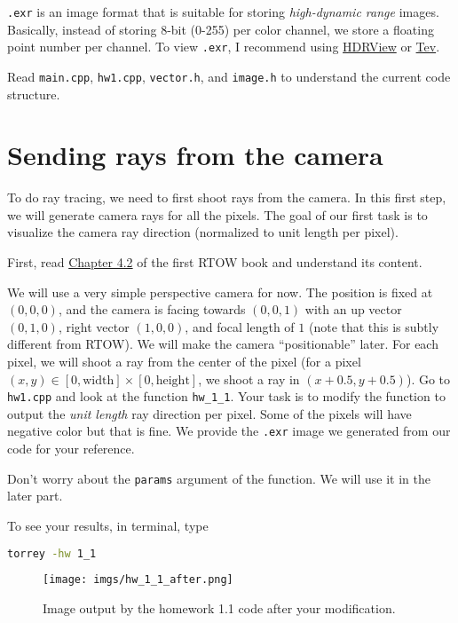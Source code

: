 \lstinline{.exr} is an image format that is suitable for storing \emph{high-dynamic range} images. Basically, instead of storing 8-bit (0-255) per color channel, we store a floating point number per channel. To view \lstinline{.exr}, I recommend using \href{https://github.com/wkjarosz/hdrview}{HDRView} or \href{https://github.com/Tom94/tev}{Tev}.

Read \lstinline{main.cpp}, \lstinline{hw1.cpp}, \lstinline{vector.h}, and \lstinline{image.h} to understand the current code structure.

\section{Sending rays from the camera}
To do ray tracing, we need to first shoot rays from the camera. In this first step, we will generate camera rays for all the pixels. The goal of our first task is to visualize the camera ray direction (normalized to unit length per pixel).

First, read \href{https://raytracing.github.io/books/RayTracingInOneWeekend.html\#rays,asimplecamera,andbackground}{Chapter 4.2} of the first RTOW book and understand its content.

We will use a very simple perspective camera for now. The position is fixed at $(0, 0, 0)$, and the camera is facing towards $(0, 0, 1)$ with an up vector $(0, 1, 0)$, right vector $(1, 0, 0)$, and focal length of $1$ (note that this is subtly different from RTOW). We will make the camera ``positionable'' later. For each pixel, we will shoot a ray from the center of the pixel (for a pixel $(x, y) \in [0, \text{width}] \times [0, \text{height}]$, we shoot a ray in $(x + 0.5, y + 0.5)$). Go to \lstinline{hw1.cpp} and look at the function \lstinline{hw_1_1}. Your task is to modify the function to output the \emph{unit length} ray direction per pixel. Some of the pixels will have negative color but that is fine. We provide the \lstinline{.exr} image we generated from our code for your reference.

Don't worry about the \lstinline{params} argument of the function. We will use it in the later part.

To see your results, in terminal, type
\begin{lstlisting}[language=bash]
  torrey -hw 1_1
\end{lstlisting}

\begin{figure}[h]
    \centering
    \texttt{[image: imgs/hw\_1\_1\_after.png]}
    \caption{Image output by the homework 1.1 code after your modification.}
    \label{fig:hw_1_1_after}
\end{figure}

